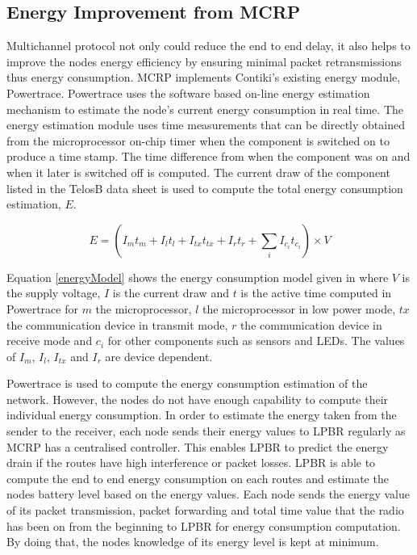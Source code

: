 \subsection{Energy Improvement from MCRP}

Multichannel protocol not only could reduce the end to end delay, it also helps to improve the nodes energy efficiency by ensuring minimal packet retransmissions thus energy consumption.
MCRP implements Contiki's existing energy module, Powertrace.
Powertrace uses the software based on-line energy estimation mechanism \cite{dunkels2007software} to estimate the node's current energy consumption in real time. 
The energy estimation module uses time measurements that can be directly obtained from the microprocessor on-chip timer when the component is switched on to produce a time stamp. The time difference from when the component was on and when it later is switched off is computed. The current draw of the component listed in the TelosB data sheet is used to compute the total energy consumption estimation, $E$. 

\begin{equation}
E = (I_{m}t_{m} + I_{l}t_{l} + I_{tx}t_{tx} + I_{r}t_{r} +  \sum_{i}I_{c_{i}}t_{c_{i}}) \times{V}
\label{energyModel}
\end{equation}

Equation \ref{energyModel} shows the energy consumption model given in \cite{dunkels2007software}  
where $V$ is the supply voltage, $I$ is the current draw and $t$ is the active time computed in Powertrace for $m$ the microprocessor, $l$ the microprocessor in low power mode, $tx$ the communication device in transmit mode, $r$ the communication device in receive mode and $c_{i}$ for other components such as sensors and LEDs. The values of $I_{m}$, $I_{l}$, $I_{tx}$ and $I_{r}$ are device dependent. 

Powertrace is used to compute the energy consumption estimation of the network. However, the nodes do not have enough capability to compute their individual energy consumption. In order to estimate the energy taken from the sender to the receiver, each node sends their energy values to LPBR regularly as MCRP has a centralised controller. This enables LPBR to predict the energy drain if the routes have high interference or packet losses. LPBR is able to compute the end to end energy consumption on each routes and estimate the nodes battery level based on the energy values. Each node sends the energy value of its packet transmission, packet forwarding and total time value that the radio has been on from the beginning to LPBR for energy consumption computation.
By doing that, the nodes knowledge of its energy level is kept at minimum. 

